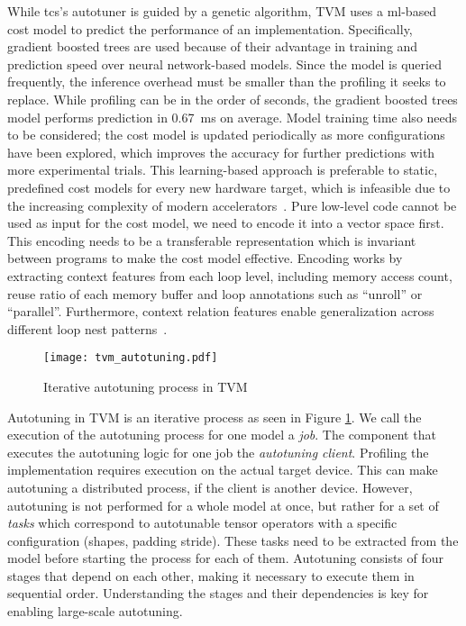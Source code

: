 While \glspl{tc}'s autotuner is guided by a genetic algorithm, TVM uses a \gls{ml}-based cost model to predict the performance of an implementation. Specifically, gradient boosted trees are used because of their advantage in training and prediction speed over neural network-based models. Since the model is queried frequently, the inference overhead must be smaller than the profiling it seeks to replace. While profiling can be in the order of seconds, the gradient boosted trees model performs prediction in \SI{0.67}{\milli\second} on average. Model training time also needs to be considered; the cost model is updated periodically as more configurations have been explored, which improves the accuracy for further predictions with more experimental trials. This learning-based approach is preferable to static, predefined cost models for every new hardware target, which is infeasible due to the increasing complexity of modern accelerators~\cite[p.~8~f.]{Chen.2018b}. Pure low-level code cannot be used as input for the cost model, we need to encode it into a vector space first. This encoding needs to be a transferable representation which is invariant between programs to make the cost model effective. Encoding works by extracting context features from each loop level, including memory access count, reuse ratio of each memory buffer and loop annotations such as \enquote{unroll} or \enquote{parallel}. Furthermore, context relation features enable generalization across different loop nest patterns~\cite[p.~4]{Chen.2018}.

\begin{figure}
	\centering
	\texttt{[image: tvm\_autotuning.pdf]}%
	\caption{Iterative autotuning process in TVM}
	\label{fig:tvm-autotuning}
\end{figure}

Autotuning in TVM is an iterative process as seen in Figure \ref{fig:tvm-autotuning}. We call the execution of the autotuning process for one model a \textit{job}. The component that executes the autotuning logic for one job the \textit{autotuning client}. Profiling the implementation requires execution on the actual target device. This can make autotuning a distributed process, if the client is another device. However, autotuning is not performed for a whole model at once, but rather for a set of \textit{tasks} which correspond to autotunable tensor operators with a specific configuration (shapes, padding stride). These tasks need to be extracted from the model before starting the process for each of them. Autotuning consists of four stages that depend on each other, making it necessary to execute them in sequential order. Understanding the stages and their dependencies is key for enabling large-scale autotuning.

